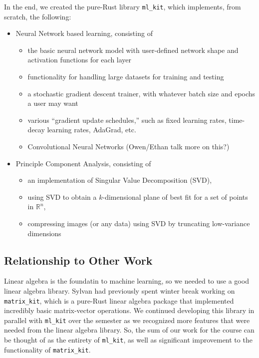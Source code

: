 \documentclass[12pt, letterpaper]{article}
\theoremstyle{definition}
\theoremstyle{remark}
\newcommand{\R}{\mathbb{R}}
\newcommand{\ftntmk}{\textcolor{blue}{\footnotemark}}
\begin{document}
In the end, we created the pure-Rust library \texttt{ml\_kit}, which implements, from scratch, the following:
\begin{itemize}
    \item Neural Network based learning, consisting of
    \begin{itemize}
        \item the basic neural network model with user-defined network shape and activation functions 
        for each layer
        \item functionality for handling large datasets for training and testing
        \item a stochastic gradient descent trainer, with whatever batch size and epochs a user may want
        \item various ``gradient update schedules,'' such as fixed learning rates, time-decay learning rates, AdaGrad, etc.
        \item Convolutional Neural Networks (Owen/Ethan talk more on this?)
    \end{itemize}
    \item Principle Component Analysis, consisting of
    \begin{itemize}
        \item an implementation of Singular Value Decomposition (SVD)\ftntmk{},
        \item using SVD to obtain a $k$-dimensional plane of best fit for a set of points in $\R^n$,
        \item compressing images (or any data) using SVD by truncating low-variance dimensions
    \end{itemize}
\end{itemize}

\subsection{Relationship to Other Work}

Linear algebra is the foundatin to machine learning, so we needed to use a good linear algebra library. Sylvan had 
previously spent winter break working on \texttt{matrix\_kit}, which is a pure-Rust linear algebra package that 
implemented incredibly basic matrix-vector operations. We continued developing this library in parallel with 
\texttt{ml\_kit} over the semester as we recognized more features that were needed from the linear algebra library. 
So, the sum of our work for the course can be thought of as the entirety of \texttt{ml\_kit}, as well as significant
improvement to the functionality of \texttt{matrix\_kit}.
\end{document}
